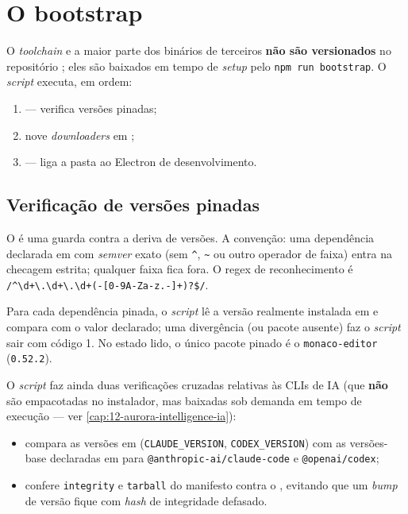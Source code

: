 \section{O bootstrap}
\label{sec:16-bootstrap}

O \emph{toolchain} e a maior parte dos binários de terceiros \textbf{não são
versionados} no repositório ; eles são baixados em tempo de
\emph{setup} pelo \texttt{npm run bootstrap}. O \emph{script} executa, em ordem:

\begin{enumerate}[nosep]
  \item {} --- verifica versões pinadas;
  \item nove \emph{downloaders} em ;
  \item {} --- liga a pasta
         ao Electron de desenvolvimento.
\end{enumerate}

\subsection{Verificação de versões pinadas}
\label{sec:16-pinned}

O  é uma guarda contra a deriva de versões.
A convenção: uma dependência declarada em  com
\emph{semver} exato (sem \lstinline|^|, \lstinline|~| ou outro operador de
faixa) entra na checagem estrita; qualquer faixa fica fora. O regex de
reconhecimento é \lstinline|/^\d+\.\d+\.\d+(-[0-9A-Za-z.-]+)?$/|.

Para cada dependência pinada, o \emph{script} lê a versão realmente instalada em
 e compara com o valor declarado; uma
divergência (ou pacote ausente) faz o \emph{script} sair com código 1. No estado
lido, o único pacote pinado é o \texttt{monaco-editor} (\texttt{0.52.2}).

O \emph{script} faz ainda duas verificações cruzadas relativas às CLIs de IA
(que \textbf{não} são empacotadas no instalador, mas baixadas sob demanda em
tempo de execução --- ver \autoref{cap:12-aurora-intelligence-ia}):

\begin{itemize}[nosep]
  \item compara as versões em 
        (\texttt{CLAUDE\_VERSION}, \texttt{CODEX\_VERSION}) com as versões-base
        declaradas em  para \lstinline|@anthropic-ai/claude-code|
        e \lstinline|@openai/codex|;
  \item confere \texttt{integrity} e \texttt{tarball} do manifesto contra o
        , evitando que um \emph{bump} de versão fique com
        \emph{hash} de integridade defasado.
\end{itemize}

